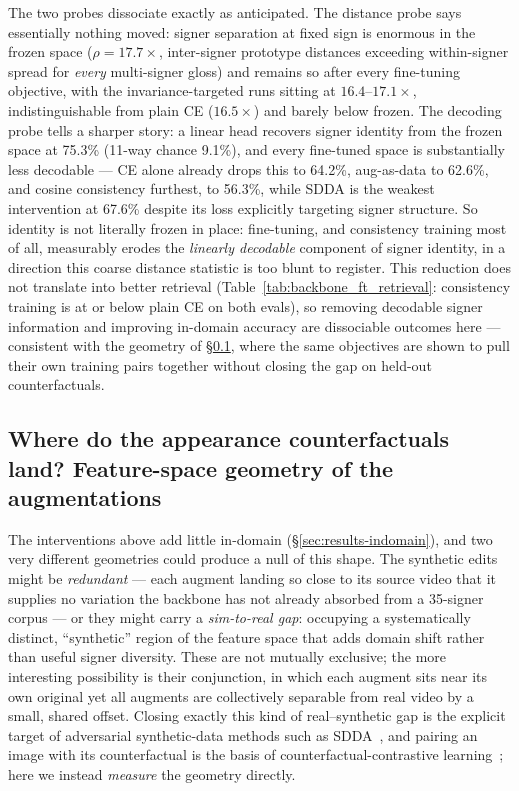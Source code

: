 The two probes dissociate exactly as anticipated. The distance probe says
essentially nothing moved: signer separation at fixed sign is enormous in
the frozen space ($\rho = 17.7\times$, inter-signer prototype distances
exceeding within-signer spread for \emph{every} multi-signer gloss) and
remains so after every fine-tuning objective, with the invariance-targeted
runs sitting at $16.4$--$17.1\times$, indistinguishable from plain CE
($16.5\times$) and barely below frozen. The decoding probe tells a
sharper story: a linear head recovers signer identity from the frozen
space at 75.3\% (11-way chance 9.1\%), and every fine-tuned space is
substantially less decodable --- CE alone already drops this to 64.2\%,
aug-as-data to 62.6\%, and cosine consistency furthest, to 56.3\%, while
SDDA is the weakest intervention at 67.6\% despite its loss explicitly
targeting signer structure. So identity is not literally frozen in place:
fine-tuning, and consistency training most of all, measurably erodes the
\emph{linearly decodable} component of signer identity, in a direction
this coarse distance statistic is too blunt to register. This reduction
does not translate into better retrieval (Table~\ref{tab:backbone_ft_retrieval}:
consistency training is at or below plain CE on both evals), so removing
decodable signer information and improving in-domain accuracy are
dissociable outcomes here --- consistent with the geometry of
\S\ref{sec:results-aug-geometry}, where the same objectives are shown to
pull their own training pairs together without closing the gap on
held-out counterfactuals.

\subsection{Where do the appearance counterfactuals land? Feature-space
geometry of the augmentations}
\label{sec:results-aug-geometry}
The interventions above add little in-domain (\S\ref{sec:results-indomain}),
and two very different geometries could produce a null of this shape. The
synthetic edits might be \emph{redundant} --- each augment landing so close
to its source video that it supplies no variation the backbone has not
already absorbed from a 35-signer corpus --- or they might carry a
\emph{sim-to-real gap}: occupying a systematically distinct, ``synthetic''
region of the feature space that adds domain shift rather than useful signer
diversity. These are not mutually exclusive; the more interesting possibility
is their conjunction, in which each augment sits near its own original yet all
augments are collectively separable from real video by a small, shared
offset. Closing exactly this kind of real--synthetic gap is the explicit
target of adversarial synthetic-data methods such as
SDDA~\cite{fuSignerDiversitydrivenData2024b}, and pairing an image with its
counterfactual is the basis of counterfactual-contrastive
learning~\cite{roschewitzCounterfactualContrastiveLearning2025}; here we
instead \emph{measure} the geometry directly.

